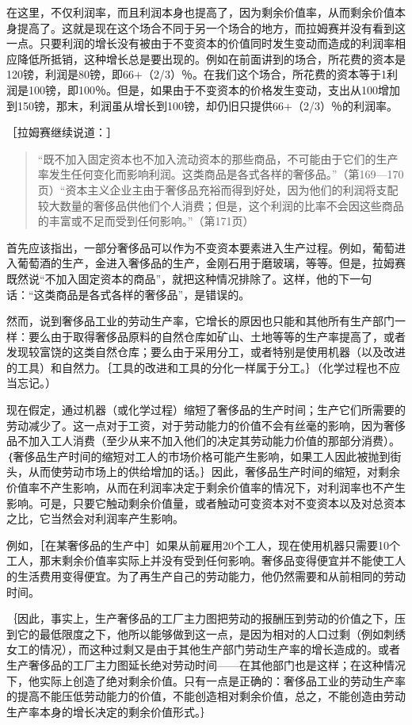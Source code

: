 在这里，不仅利润率，而且利润本身也提高了，因为剩余价值率，从而剩余价值本身提高了。这就是现在这个场合不同于另一个场合的地方，而拉姆赛并没有看到这一点。只要利润的增长没有被由于不变资本的价值同时发生变动而造成的利润率相应降低所抵销，这种增长总是要出现的。例如在前面讲到的场合，所花费的资本是120镑，利润是80镑，即66+（2/3）％。在我们这个场合，所花费的资本等于1利润是100镑，即100％。但是，如果由于不变资本的价格发生变动，支出从100增加到150镑，那末，利润虽从增长到100镑，却仍旧只提供66+（2/3）％的利润率。

［拉姆赛继续说道：］

\begin{quote}{“既不加入固定资本也不加入流动资本的那些商品，不可能由于它们的生产率发生任何变化而影响利润。这类商品是各式各样的奢侈品。”（第169—170页）“资本主义企业主由于奢侈品充裕而得到好处，因为他们的利润将支配较大数量的奢侈品供他们个人消费；但是，这个利润的比率不会因这些商品的丰富或不足而受到任何影响。”（第171页）}\end{quote}

首先应该指出，一部分奢侈品可以作为不变资本要素进入生产过程。例如，葡萄进入葡萄酒的生产，金进入奢侈品的生产，金刚石用于磨玻璃，等等。但是，拉姆赛既然说“不加入固定资本的商品”，就把这种情况排除了。这样，他的下一句话：“这类商品是各式各样的奢侈品”，是错误的。

然而，说到奢侈品工业的劳动生产率，它增长的原因也只能和其他所有生产部门一样：要么由于取得奢侈品原料的自然仓库如矿山、土地等等的生产率提高了，或者发现较富饶的这类自然仓库；要么由于采用分工，或者特别是使用机器（以及改进的工具）和自然力。｛工具的改进和工具的分化一样属于分工。｝（化学过程也不应当忘记。）

现在假定，通过机器（或化学过程）缩短了奢侈品的生产时间；生产它们所需要的劳动减少了。这一点对于工资，对于劳动能力的价值不会有丝毫的影响，因为奢侈品不加入工人消费（至少从来不加入他们的决定其劳动能力价值的那部分消费）。｛奢侈品生产时间的缩短对工人的市场价格可能产生影响，如果工人因此被抛到街头，从而使劳动市场上的供给增加的话。｝因此，奢侈品生产时间的缩短，对剩余价值率不产生影响，从而在利润率决定于剩余价值率的情况下，对利润率也不产生影响。可是，只要它触动剩余价值量，或者触动可变资本对不变资本以及对总资本之比，它当然会对利润率产生影响。

例如，［在某奢侈品的生产中］如果从前雇用20个工人，现在使用机器只需要10个工人，那末剩余价值率实际上并没有受到任何影响。奢侈品变得便宜并不能使工人的生活费用变得便宜。为了再生产自己的劳动能力，他仍然需要和从前相同的劳动时间。

｛因此，事实上，生产奢侈品的工厂主力图把劳动的报酬压到劳动的价值之下，压到它的最低限度之下，他所以能够做到这一点，是因为相对的人口过剩（例如刺绣女工的情况），而这种过剩又是由于其他生产部门劳动生产率的增长造成的。或者生产奢侈品的工厂主力图延长绝对劳动时间——在其他部门也是这样；在这种情况下，他实际上创造了绝对剩余价值。只有一点是正确的：奢侈品工业的劳动生产率的提高不能压低劳动能力的价值，不能创造相对剩余价值，总之，不能创造由劳动生产率本身的增长决定的剩余价值形式。｝

